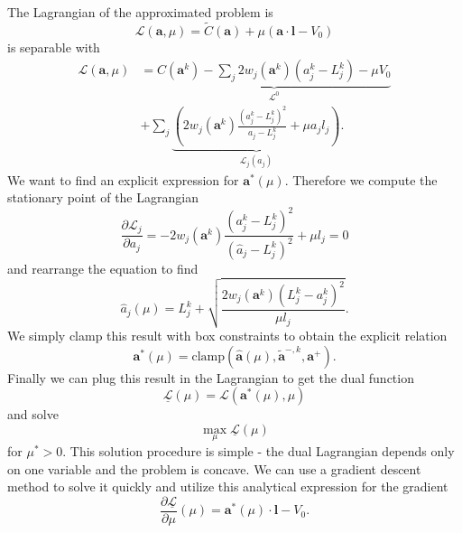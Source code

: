 The Lagrangian of the approximated problem is
\begin{equation}
    \mathcal{L}(\mathbf{a}, \mu) = \tilde{C}(\mathbf{a}) + \mu \left( \mathbf{a} \cdot \mathbf{l} - V_0 \right)
\end{equation}
is separable with 
\begin{equation}
    \begin{split}
        \mathcal{L}(\mathbf{a}, \mu) &= \underbrace{C(\mathbf{a}^k) - \sum_j 2w_j (\mathbf{a}^k) (a^k_j-L^k_j) - \mu V_0}_{\mathcal{L}^0} \\
        &+ \sum_j \underbrace{\left(2 w_j (\mathbf{a}^k)
        \frac{(a^k_j-L^k_j)^2}{a_j-L^k_j} + \mu a_j l_j \right)}_{\mathcal{L}_j (a_j)}.
    \end{split}
\end{equation}
We want to find an explicit expression for $\mathbf{a}^*(\mu)$. Therefore we compute the stationary point of the Lagrangian
\begin{equation}
    \frac{\partial \mathcal{L}_j}{\partial a_j} = -2 w_j (\mathbf{a}^k)
    \frac{(a^k_j-L^k_j)^2}{(\hat{a}_j-L^k_j)^2} + \mu l_j = 0
\end{equation}
and rearrange the equation to find 
\begin{equation}
    \hat{a}_j(\mu) = L_j^k + \sqrt{\frac{2 w_j (\mathbf{a}^k)
    (L^k_j-a^k_j)^2}{\mu l_j}}. 
\end{equation}
We simply clamp this result with box constraints to obtain the explicit relation 
\begin{equation}
    \mathbf{a}^* (\mu) = \textrm{clamp}\left(\hat{\mathbf{a}}(\mu), \tilde{\mathbf{a}}^{-,k}, \mathbf{a}^+\right). 
\end{equation}
Finally we can plug this result in the Lagrangian to get the dual function
\begin{equation}
    \underline{\mathcal{L}}(\mu) = \mathcal{L}(\mathbf{a}^* (\mu), \mu)
\end{equation}
and solve 
\begin{equation}
    \max_{\mu} \underline{\mathcal{L}}(\mu)
\end{equation}
for $\mu^*>0$. This solution procedure is simple - the dual Lagrangian depends only on one variable and the problem is concave. We can use a gradient descent method to solve it quickly and utilize this analytical expression for the gradient 
\begin{equation}
    \frac{\partial \underline{\mathcal{L}}}{\partial \mu}(\mu) =  \mathbf{a}^* (\mu) \cdot \mathbf{l} - V_0.
\end{equation}


